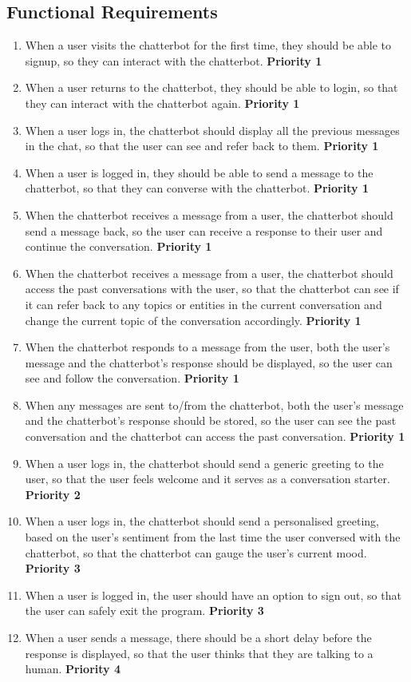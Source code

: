 \subsection{Functional Requirements} \label{ssection:functional}
\begin{enumerate}
	\item When a user visits the chatterbot for the first time, they should be able to signup, so they can interact with the chatterbot. \textbf{Priority 1}
	\item When a user returns to the chatterbot, they should be able to login, so that they can interact with the chatterbot again. \textbf{Priority 1}
	\item When a user logs in, the chatterbot should display all the previous messages in the chat, so that the user can see and refer back to them. \textbf{Priority 1}
	\item When a user is logged in, they should be able to send a message to the chatterbot, so that they can converse with the chatterbot. \textbf{Priority 1}
	\item When the chatterbot receives a message from a user, the chatterbot should send a message back, so the user can receive a response to their user and continue the conversation. \textbf{Priority 1}
	\item When the chatterbot receives a message from a user, the chatterbot should access the past conversations with the user, so that the chatterbot can see if it can refer back to any topics or entities in the current conversation and change the current topic of the conversation accordingly. \textbf{Priority 1}
	\item When the chatterbot responds to a message from the user, both the user's message and the chatterbot's response should be displayed, so the user can see and follow the conversation. \textbf{Priority 1}
	\item When any messages are sent to/from the chatterbot, both the user's message and the chatterbot's response should be stored, so the user can see the past conversation and the chatterbot can access the past conversation. \textbf{Priority 1}
	\item When a user logs in, the chatterbot should send a generic greeting to the user, so that the user feels welcome and it serves as a conversation starter. \textbf{Priority 2}
	\item When a user logs in, the chatterbot should send a personalised greeting, based on the user's sentiment from the last time the user conversed with the chatterbot, so that the chatterbot can gauge the user's current mood. \textbf{Priority 3}
	\item When a user is logged in, the user should have an option to sign out, so that the user can safely exit the program. \textbf{Priority 3}
	\item When a user sends a message, there should be a short delay before the response is displayed, so that the user thinks that they are talking to a human. \textbf{Priority 4}
\end{enumerate}
